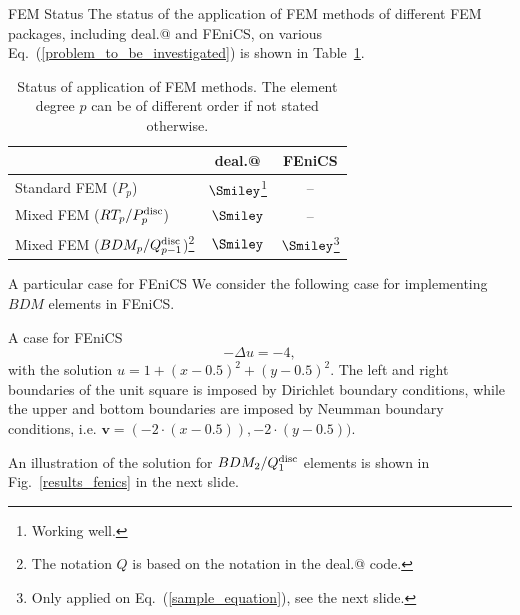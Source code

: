 \documentclass{beamer}
\makeatletter
\newcommand*{\rom}[1]{\expandafter\@slowromancap\romannumeral #1@}
\makeatother
\begin{document}
\begin{frame}{FEM Status}
\vspace{-3em}
The status of the application of FEM methods of different FEM packages, including deal.\rom{2} and FEniCS, on various Eq.~(\ref{problem_to_be_investigated}) is shown in Table~\ref{table_status_fem_application}.
\begin{table}[!ht]
\scriptsize
\begin{tabular}{ l | c | c}
 & deal.\rom{2} & FEniCS \\ \hline
 Standard FEM ($P_p$) & $\Smiley$\footnote{Working well.} & -- \\ \hline
 Mixed FEM ($RT_p/P_{p}^{\rm disc}$) & $\Smiley$ & -- \\ \hline
 Mixed FEM ($BDM_p/Q_{p-1}^{\rm disc}$)\footnote{The notation $Q$ is based on the notation in the deal.\rom{2} code.} & $\Smiley$ & $\Smiley$\footnote{Only applied on Eq.~(\ref{sample_equation}), see the next slide.}
\end{tabular}
\caption{Status of application of FEM methods. The element degree $p$ can be of different order if not stated otherwise.}
\label{table_status_fem_application}
\end{table}
\end{frame}

\begin{frame}{A particular case for FEniCS}
\vspace{-3em}
We consider the following case for implementing $BDM$ elements in FEniCS.
\begin{block}{A case for FEniCS}
\begin{equation}
 -\Delta u = -4,
 \label{sample_equation}
\end{equation}
with the solution $u=1+(x-0.5)^2+(y-0.5)^2$.
The left and right boundaries of the unit square is imposed by Dirichlet boundary conditions, while the upper and bottom boundaries are imposed by Neumman boundary conditions, i.e. $\mathbf{v}=(-2\cdot(x-0.5)), -2\cdot(y-0.5))$.
\end{block}
An illustration of the solution for $BDM_2/Q_1^{\rm disc}$ elements is shown in Fig.~\ref{results_fenics} in the next slide.
\end{frame}
\end{document}
